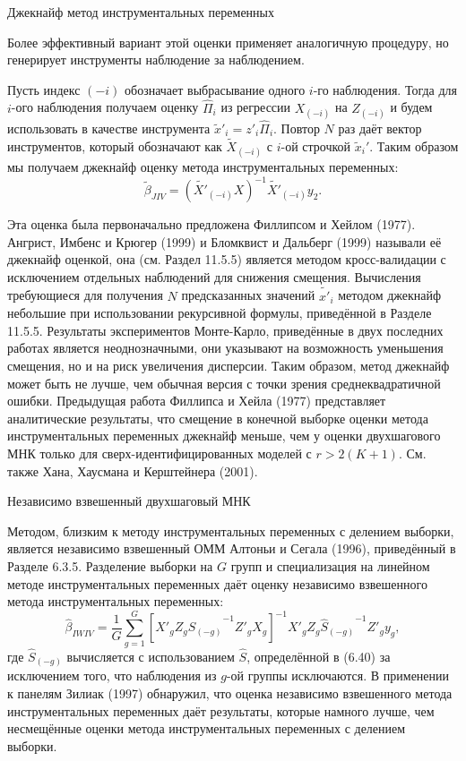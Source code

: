 \begin{center}
Джекнайф метод инструментальных переменных 
\end{center}

Более эффективный вариант этой оценки применяет аналогичную процедуру, но генерирует инструменты наблюдение за наблюдением.

Пусть индекс $(-i)$ обозначает выбрасывание одного $i$-го наблюдения. Тогда для $i$-ого наблюдения получаем оценку $\hat{\Pi}_i$ из регрессии $X_{(-i)}$ на $Z_{(-i)}$ и будем использовать в качестве инструмента $\tilde{x}'_i=z'_i \hat{\Pi}_i$. Повтор $N$ раз даёт вектор инструментов, который обозначают как $\tilde{X}_{(-i)}$ с $i$-ой строчкой $\tilde{x}_i'$. Таким образом мы получаем джекнайф оценку  метода инструментальных переменных:
\[
\tilde{\beta}_{JIV}=(\tilde{X'}_{(-i)}X)^{-1} \tilde{X'}_{(-i)} y_2.
\]

Эта оценка была первоначально предложена Филлипсом и Хейлом (1977). Ангрист, Имбенс и Крюгер (1999) и Бломквист и Дальберг (1999) называли её джекнайф оценкой, она (см. Раздел 11.5.5) является методом кросс-валидации с исключением отдельных наблюдений для снижения смещения. Вычисления требующиеся для получения $N$ предсказанных значений $\tilde{x'}_i$ методом джекнайф небольшие при использовании рекурсивной формулы, приведённой в Разделе 11.5.5. Результаты экспериментов Монте-Карло, приведённые в двух последних работах является неоднозначными, они указывают на возможность уменьшения смещения, но и на риск  увеличения дисперсии. Таким образом, метод джекнайф может быть не лучше, чем обычная версия с точки зрения среднеквадратичной ошибки. Предыдущая работа Филлипса и Хейла (1977) представляет аналитические результаты, что смещение в конечной выборке оценки метода инструментальных переменных джекнайф меньше, чем у оценки двухшагового МНК только для сверх-идентифицированных моделей с $r > 2(K+1)$. См. также Хана, Хаусмана и Керштейнера (2001).

\begin{center}
Независимо взвешенный двухшаговый МНК
\end{center}

Методом, близким к методу инструментальных переменных с делением выборки, является независимо взвешенный ОММ Алтоньи и Сегала (1996), приведённый в Разделе 6.3.5. Разделение выборки на $G$ групп и специализация на линейном методе инструментальных переменных даёт оценку независимо взвешенного метода инструментальных переменных:
\[
\hat{\beta}_{IWIV}=\frac{1}{G} \sum_{g=1}^{G} [X'_g Z_g {\hat{S}_{(-g)}}^{-1} Z'_g X_g]^{-1} X'_g Z_g {\hat{S}_{(-g)}}^{-1} Z'_g y_g,
\]
где $\hat{S}_{(-g)}$ вычисляется с использованием $\hat{S}$, определённой в (6.40) за исключением того, что наблюдения из $g$-ой группы исключаются. В применении к панелям Зилиак (1997) обнаружил, что оценка независимо взвешенного метода инструментальных переменных даёт результаты, которые намного лучше, чем несмещённые оценки метода инструментальных переменных с делением выборки.

